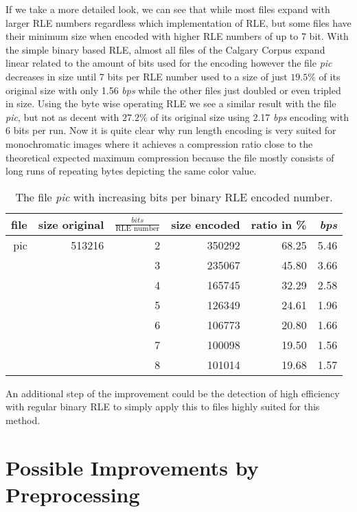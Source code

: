 \par{
If we take a more detailed look, we can see that while most files expand with larger RLE numbers regardless which implementation of RLE, but some files have their minimum size when encoded with higher RLE numbers of up to 7 bit. With the simple binary based RLE, almost all files of the Calgary Corpus expand linear related to the amount of bits used for the encoding however the file \textit{pic} decreases in size until 7 bits per RLE number used to a size of just $19.5 \%$ of its original size with only  1.56 \textit{bps} while the other files just doubled or even tripled in size. Using the byte wise operating RLE we see a similar result with the file \textit{pic}, but not as decent with $27.2\%$ of its original size using 2.17 \textit{bps} encoding with 6 bits per run. Now it is quite clear why run length encoding is very suited for monochromatic images where it achieves a compression ratio close to the theoretical expected maximum compression because the file mostly consists of long runs of repeating bytes depicting the same color value.

\begin{table}[H]
	\centering
	\begin{tabular}{r|r|r|r|r|r}	
		file & size original & $\frac{bits}{\text{RLE number}}$ & size encoded & ratio in \% & \textit{bps}\\
		\hline
		pic & 513216 & 2 & 350292 & 68.25 & 5.46 \\
		 & & 3 & 235067 & 45.80 & 3.66\\
		 & & 4 & 165745 & 32.29 & 2.58\\
		 & & 5 & 126349 & 24.61 & 1.96\\
		 & & 6 & 106773 & 20.80 & 1.66\\
		 & & 7 & 100098 & 19.50 & 1.56\\
		 & & 8 & 101014 & 19.68 & 1.57\\		 
	\end{tabular}
	\caption{The file \textit{pic} with increasing bits per binary RLE encoded number.}
	\label{tab:t40 The file pic with increasing bits per RLE encoded number}
\end{table}	
}

\par{
An additional step of the improvement could be the detection of high efficiency with regular binary RLE to simply apply this to files highly suited for this method.
}

\section{Possible Improvements by Preprocessing}
\label{ch:Analysis:sec:Improvements by Preprocessing}

